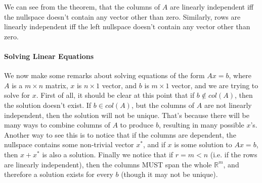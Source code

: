 \documentclass[12pt,oneside]{article}
\begin{document}
We can see from the theorem, that the columns of $A$ are linearly
independent iff the nullspace doesn't contain any vector other than
zero. Similarly, rows are linearly independent iff the left nullspace
doesn't contain any vector other than zero.

\paragraph{Solving Linear Equations}
We now make some remarks about solving equations of the form $Ax = b$, where $A$ is a $m \times n$ matrix, $x$ is $n \times 1$ vector, and $b$ is $m \times 1$ vector, and we are trying to solve for $x$. First of all, it should be clear at this point that if $b \notin col(A)$, then the solution doesn't exist. If $b \in col(A)$, but the columns of $A$ are not linearly independent, then the solution will not be unique. That's because there will be many ways to combine columns of $A$ to produce $b$, resulting in many possible $x$'s. Another way to see this is to notice that if the columns are dependent, the nullspace contains some non-trivial vector $x^*$, and if $x$ is some solution to $Ax = b$, then $x + x^*$ is also a solution. Finally we notice that if $r = m < n$ (i.e. if the rows are linearly independent), then the columns MUST span the whole ${\mathbb{R}}^m$, and therefore a solution exists for every $b$ (though it may not be unique).
\end{document}
